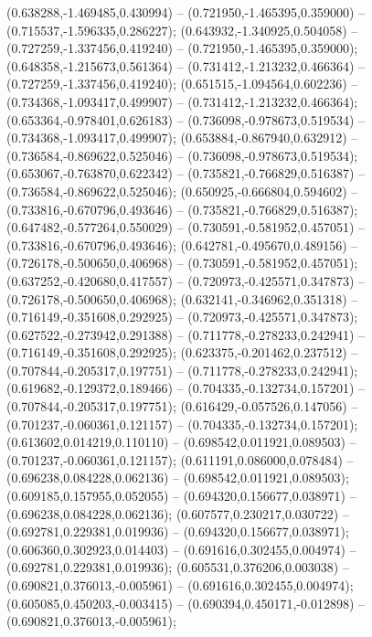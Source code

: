  (0.638288,-1.469485,0.430994) -- (0.721950,-1.465395,0.359000) -- (0.715537,-1.596335,0.286227);
 (0.643932,-1.340925,0.504058) -- (0.727259,-1.337456,0.419240) -- (0.721950,-1.465395,0.359000);
 (0.648358,-1.215673,0.561364) -- (0.731412,-1.213232,0.466364) -- (0.727259,-1.337456,0.419240);
 (0.651515,-1.094564,0.602236) -- (0.734368,-1.093417,0.499907) -- (0.731412,-1.213232,0.466364);
 (0.653364,-0.978401,0.626183) -- (0.736098,-0.978673,0.519534) -- (0.734368,-1.093417,0.499907);
 (0.653884,-0.867940,0.632912) -- (0.736584,-0.869622,0.525046) -- (0.736098,-0.978673,0.519534);
 (0.653067,-0.763870,0.622342) -- (0.735821,-0.766829,0.516387) -- (0.736584,-0.869622,0.525046);
 (0.650925,-0.666804,0.594602) -- (0.733816,-0.670796,0.493646) -- (0.735821,-0.766829,0.516387);
 (0.647482,-0.577264,0.550029) -- (0.730591,-0.581952,0.457051) -- (0.733816,-0.670796,0.493646);
 (0.642781,-0.495670,0.489156) -- (0.726178,-0.500650,0.406968) -- (0.730591,-0.581952,0.457051);
 (0.637252,-0.420680,0.417557) -- (0.720973,-0.425571,0.347873) -- (0.726178,-0.500650,0.406968);
 (0.632141,-0.346962,0.351318) -- (0.716149,-0.351608,0.292925) -- (0.720973,-0.425571,0.347873);
 (0.627522,-0.273942,0.291388) -- (0.711778,-0.278233,0.242941) -- (0.716149,-0.351608,0.292925);
 (0.623375,-0.201462,0.237512) -- (0.707844,-0.205317,0.197751) -- (0.711778,-0.278233,0.242941);
 (0.619682,-0.129372,0.189466) -- (0.704335,-0.132734,0.157201) -- (0.707844,-0.205317,0.197751);
 (0.616429,-0.057526,0.147056) -- (0.701237,-0.060361,0.121157) -- (0.704335,-0.132734,0.157201);
 (0.613602,0.014219,0.110110) -- (0.698542,0.011921,0.089503) -- (0.701237,-0.060361,0.121157);
 (0.611191,0.086000,0.078484) -- (0.696238,0.084228,0.062136) -- (0.698542,0.011921,0.089503);
 (0.609185,0.157955,0.052055) -- (0.694320,0.156677,0.038971) -- (0.696238,0.084228,0.062136);
 (0.607577,0.230217,0.030722) -- (0.692781,0.229381,0.019936) -- (0.694320,0.156677,0.038971);
 (0.606360,0.302923,0.014403) -- (0.691616,0.302455,0.004974) -- (0.692781,0.229381,0.019936);
 (0.605531,0.376206,0.003038) -- (0.690821,0.376013,-0.005961) -- (0.691616,0.302455,0.004974);
 (0.605085,0.450203,-0.003415) -- (0.690394,0.450171,-0.012898) -- (0.690821,0.376013,-0.005961);
